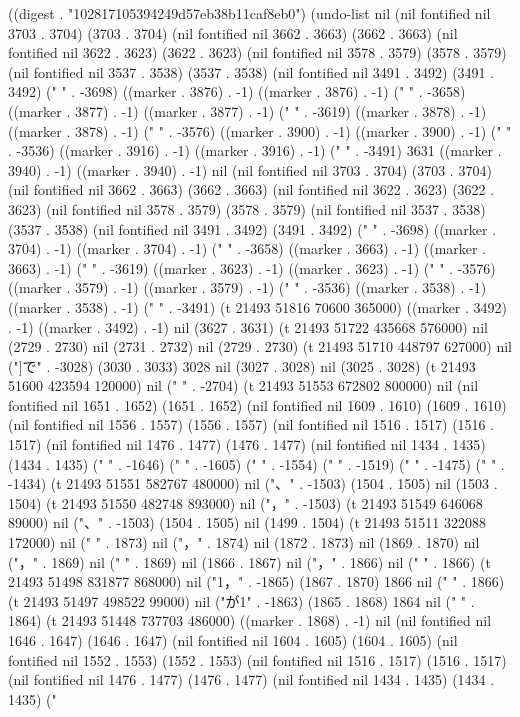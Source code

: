 
((digest . "102817105394249d57eb38b11caf8eb0") (undo-list nil (nil fontified nil 3703 . 3704) (3703 . 3704) (nil fontified nil 3662 . 3663) (3662 . 3663) (nil fontified nil 3622 . 3623) (3622 . 3623) (nil fontified nil 3578 . 3579) (3578 . 3579) (nil fontified nil 3537 . 3538) (3537 . 3538) (nil fontified nil 3491 . 3492) (3491 . 3492) ("
" . -3698) ((marker . 3876) . -1) ((marker . 3876) . -1) ("
" . -3658) ((marker . 3877) . -1) ((marker . 3877) . -1) ("
" . -3619) ((marker . 3878) . -1) ((marker . 3878) . -1) ("
" . -3576) ((marker . 3900) . -1) ((marker . 3900) . -1) ("
" . -3536) ((marker . 3916) . -1) ((marker . 3916) . -1) ("
" . -3491) 3631 ((marker . 3940) . -1) ((marker . 3940) . -1) nil (nil fontified nil 3703 . 3704) (3703 . 3704) (nil fontified nil 3662 . 3663) (3662 . 3663) (nil fontified nil 3622 . 3623) (3622 . 3623) (nil fontified nil 3578 . 3579) (3578 . 3579) (nil fontified nil 3537 . 3538) (3537 . 3538) (nil fontified nil 3491 . 3492) (3491 . 3492) ("
" . -3698) ((marker . 3704) . -1) ((marker . 3704) . -1) ("
" . -3658) ((marker . 3663) . -1) ((marker . 3663) . -1) ("
" . -3619) ((marker . 3623) . -1) ((marker . 3623) . -1) ("
" . -3576) ((marker . 3579) . -1) ((marker . 3579) . -1) ("
" . -3536) ((marker . 3538) . -1) ((marker . 3538) . -1) ("
" . -3491) (t 21493 51816 70600 365000) ((marker . 3492) . -1) ((marker . 3492) . -1) nil (3627 . 3631) (t 21493 51722 435668 576000) nil (2729 . 2730) nil (2731 . 2732) nil (2729 . 2730) (t 21493 51710 448797 627000) nil ("]で" . -3028) (3030 . 3033) 3028 nil (3027 . 3028) nil (3025 . 3028) (t 21493 51600 423594 120000) nil (" " . -2704) (t 21493 51553 672802 800000) nil (nil fontified nil 1651 . 1652) (1651 . 1652) (nil fontified nil 1609 . 1610) (1609 . 1610) (nil fontified nil 1556 . 1557) (1556 . 1557) (nil fontified nil 1516 . 1517) (1516 . 1517) (nil fontified nil 1476 . 1477) (1476 . 1477) (nil fontified nil 1434 . 1435) (1434 . 1435) ("
" . -1646) ("
" . -1605) ("
" . -1554) ("
" . -1519) ("
" . -1475) ("
" . -1434) (t 21493 51551 582767 480000) nil ("、" . -1503) (1504 . 1505) nil (1503 . 1504) (t 21493 51550 482748 893000) nil ("，" . -1503) (t 21493 51549 646068 89000) nil ("、" . -1503) (1504 . 1505) nil (1499 . 1504) (t 21493 51511 322088 172000) nil (" " . 1873) nil ("，" . 1874) nil (1872 . 1873) nil (1869 . 1870) nil ("，" . 1869) nil (" " . 1869) nil (1866 . 1867) nil ("，" . 1866) nil (" " . 1866) (t 21493 51498 831877 868000) nil ("1，" . -1865) (1867 . 1870) 1866 nil (" " . 1866) (t 21493 51497 498522 99000) nil ("が1" . -1863) (1865 . 1868) 1864 nil (" " . 1864) (t 21493 51448 737703 486000) ((marker . 1868) . -1) nil (nil fontified nil 1646 . 1647) (1646 . 1647) (nil fontified nil 1604 . 1605) (1604 . 1605) (nil fontified nil 1552 . 1553) (1552 . 1553) (nil fontified nil 1516 . 1517) (1516 . 1517) (nil fontified nil 1476 . 1477) (1476 . 1477) (nil fontified nil 1434 . 1435) (1434 . 1435) ("
